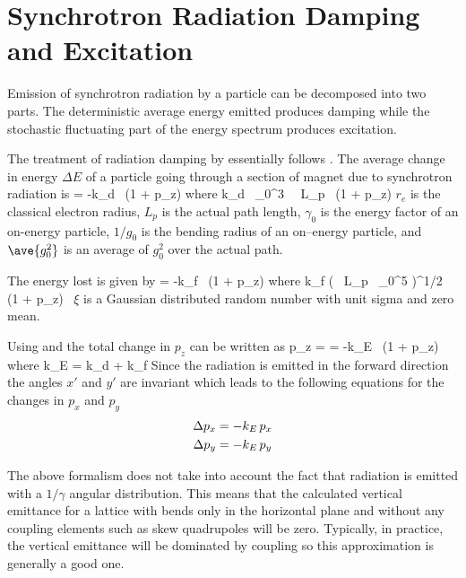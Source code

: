 \section{Synchrotron Radiation Damping and Excitation}
\label{s:radiation}

Emission of synchrotron radiation by a particle can be decomposed into
two parts. The deterministic average energy emitted produces damping
while the stochastic fluctuating part of the energy spectrum produces excitation\cite{b:jowett}.

The treatment of radiation damping by \bmad essentially follows \mad.
The average change in energy $\Delta E$ of a particle going through a
section of magnet due to synchrotron radiation is
\Begineq
   = -k_d \, (1 + p_z)
\Endeq
where
\Begineq
  k_d \equiv {} \, \gamma_0^3 \,  \, L_p \,  
  (1 + p_z)
  \label{k2r3g}
\Endeq
$r_e$ is the classical electron radius, $L_p$ is the actual path
length, $\gamma_0$ is the energy factor of an on-energy particle, $1/g_0$
is the bending radius of an on--energy particle, and $\ave{g_0^2}$ is an
average of $g_0^2$ over the actual path.

The energy lost is given by
\Begineq
   = -k_f \, (1 + p_z)
\Endeq
where
\Begineq
  k_f \equiv \left(  \, 
  L_p \, \gamma_0^5  \right)^{1/2} \, (1 + p_z) \, \xi
  \label{k55rh}
\Endeq
$\xi$ is a Gaussian distributed random number with unit sigma and zero mean.

Using  and  the total change in $p_z$ can be written as
\Begineq
  \Delta p_z =  = -k_E \, (1 + p_z)
\Endeq
where
\Begineq
  k_E = k_d + k_f
\Endeq
Since the radiation is emitted in the forward direction the angles
$x'$ and $y'$ are invariant which leads to the following equations for
the changes in $p_x$ and $p_y$
\begin{align}
  \Delta p_x &= -k_E \, p_x \nonumber \\
  \Delta p_y &= -k_E \, p_y 
\end{align}

The above formalism does not take into account the fact that radiation is 
emitted with a $1/\gamma$ angular distribution. This means that the calculated
vertical emittance for a lattice with
bends only in the horizontal plane and without any coupling elements such as
skew quadrupoles will be zero. Typically, in practice, the vertical emittance
will be dominated by coupling so this approximation is generally a good one.


